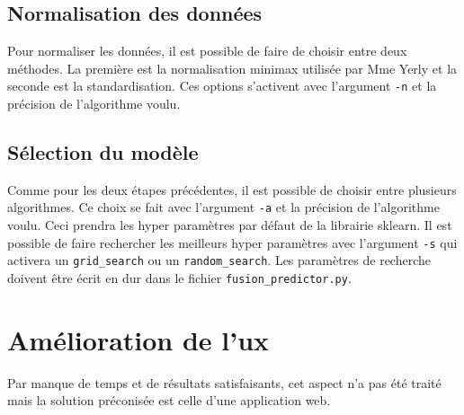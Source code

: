 \subsection{Normalisation des données}
Pour normaliser les données, il est possible de faire de choisir entre deux méthodes.
La première est la normalisation \acrshort{minimax} utilisée par Mme Yerly et la seconde est la standardisation.
Ces options s'activent avec l'argument \texttt{-n} et la précision de l'algorithme voulu.

\subsection{Sélection du modèle}
Comme pour les deux étapes précédentes, il est possible de choisir entre plusieurs algorithmes.
Ce choix se fait avec l'argument \texttt{-a} et la précision de l'algorithme voulu.
Ceci prendra les hyper paramètres par défaut de la librairie \acrshort{sklearn}.
Il est possible de faire rechercher les meilleurs hyper paramètres avec l'argument \texttt{-s} qui activera un \texttt{grid\_search} ou un \texttt{random\_search}.
Les paramètres de recherche doivent être écrit en dur dans le fichier \texttt{fusion\_predictor.py}.

\section{Amélioration de l'\acrshort{ux}}
Par manque de temps et de résultats satisfaisants, cet aspect n'a pas été traité mais la solution préconisée est celle d'une application web.
